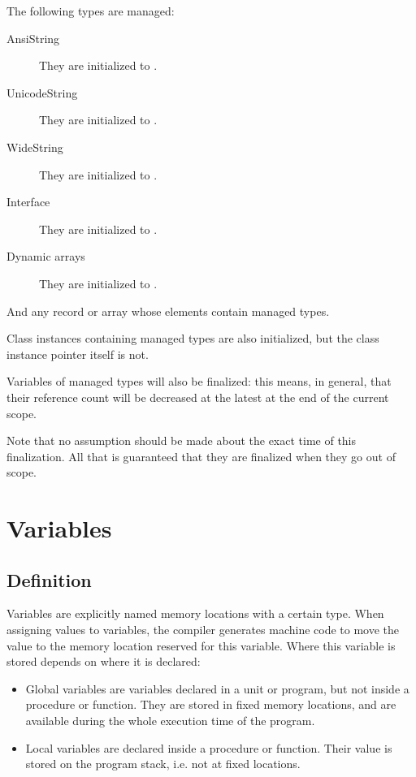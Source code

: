 The following types are managed:
\begin{description}
\item[AnsiString] They are initialized  to .
\item[UnicodeString] They are initialized  to .
\item[WideString] They are initialized  to .
\item[Interface] They are initialized  to .
\item[Dynamic arrays] They are initialized  to .
\end{description}
And any record or array whose elements contain managed types.

Class instances containing managed types are also initialized, but the class
instance pointer itself is not.

Variables of managed types will also be finalized: this means, in general, that their
reference count will be decreased at the latest at the end of the current scope.

\begin{remark}
Note that no assumption should be made about the exact time of this
finalization. All that is guaranteed that they are finalized when they go
out of scope.
\end{remark}

\chapter{Variables}
\label{ch:Variables}
\section{Definition}
Variables are explicitly named memory locations with a certain type. When
assigning values to variables, the \fpc compiler generates machine code 
to move the value to the memory location reserved for this variable. Where
this variable is stored depends on where it is declared:

\begin{itemize}
\item Global variables are variables declared in a unit or program, but not
inside a procedure or function. They are stored in fixed memory locations,
and are available during the whole execution time of the program.
\item Local variables are declared inside a procedure or function. Their
value is stored on the program stack, i.e. not at fixed locations.
\end{itemize}

